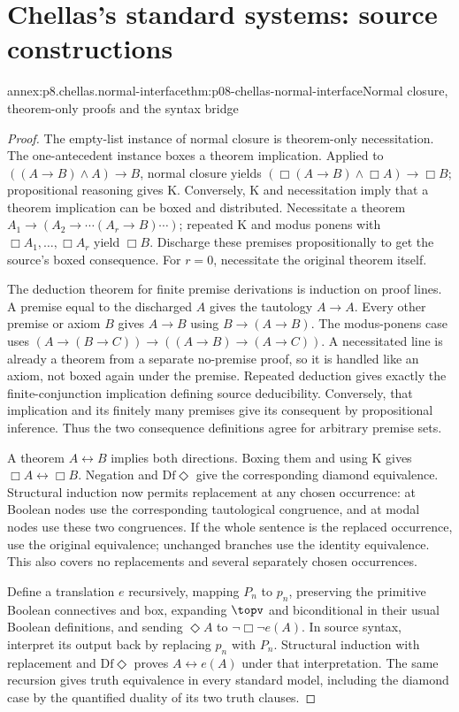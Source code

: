 \section{Chellas's standard systems: source constructions}

\begin{annexitem}{annex:p8.chellas.normal-interface}{thm:p08-chellas-normal-interface}{Normal closure, theorem-only proofs and the syntax bridge}
\begin{proof}
The empty-list instance of normal closure is theorem-only necessitation.
The one-antecedent instance boxes a theorem implication. Applied to
\(((A\to B)\land A)\to B\), normal closure yields
\((\Box(A\to B)\land\Box A)\to\Box B\); propositional reasoning
gives K. Conversely, K and necessitation imply that a theorem implication
can be boxed and distributed. Necessitate a theorem
\(A_1\to(A_2\to\cdots(A_r\to B)\cdots)\); repeated K and
modus ponens with \(\Box A_1,\ldots,\Box A_r\) yield \(\Box B\).
Discharge these premises propositionally to get the source's boxed
consequence. For \(r=0\), necessitate the original theorem itself.

The deduction theorem for finite premise derivations is induction on
proof lines. A premise equal to the discharged \(A\) gives the
tautology \(A\to A\). Every other premise or axiom \(B\) gives
\(A\to B\) using \(B\to(A\to B)\). The modus-ponens case
uses \((A\to(B\to C))\to((A\to B)\to(A\to C))\).
A necessitated line is already a theorem from a separate no-premise
proof, so it is handled like an axiom, not boxed again under the premise.
Repeated deduction gives exactly the finite-conjunction implication
defining source deducibility. Conversely, that implication and its
finitely many premises give its consequent by propositional inference.
Thus the two consequence definitions agree for arbitrary premise sets.

A theorem \(A\leftrightarrow B\) implies both directions. Boxing
them and using K gives \(\Box A\leftrightarrow\Box B\).
Negation and \(\mathrm{Df}\Diamond\) give the corresponding diamond
equivalence. Structural induction now permits replacement at any
chosen occurrence: at Boolean nodes use the corresponding tautological
congruence, and at modal nodes use these two congruences. If the whole
sentence is the replaced occurrence, use the original equivalence;
unchanged branches use the identity equivalence. This also covers no
replacements and several separately chosen occurrences.

Define a translation \(e\) recursively, mapping \(P_n\) to \(p_n\),
preserving the primitive Boolean connectives and box, expanding
\(\topv\) and biconditional in their usual Boolean definitions,
and sending \(\Diamond A\) to \(\neg\Box\neg e(A)\).
In source syntax, interpret its output back by replacing \(p_n\)
with \(P_n\). Structural induction with replacement and
\(\mathrm{Df}\Diamond\) proves \(A\leftrightarrow e(A)\)
under that interpretation. The same recursion gives truth equivalence
in every standard model, including the diamond case by the quantified
duality of its two truth clauses.


\end{proof}
\end{annexitem}

